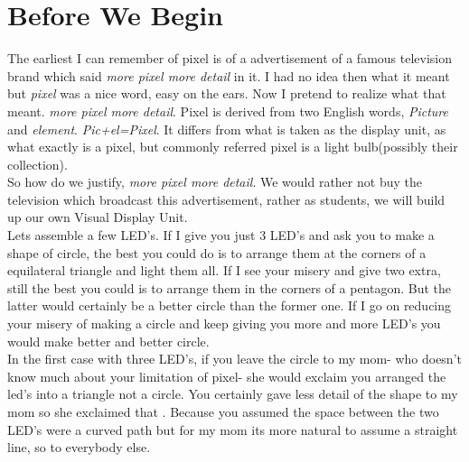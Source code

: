 \documentclass[a4paper,12pt,oneside]{book}
\begin{document}
 
\vfill
\pagebreak


\section*{\textbf Before We Begin}

The earliest I can remember of pixel is of a advertisement of a famous television brand which said \emph{more pixel more detail} in it. I had no idea then what it meant but \emph{pixel} was a nice word, easy on the ears. Now I pretend to realize what that meant. \emph{more pixel more detail}.
Pixel is derived from two English words, \emph{Picture} and \emph{element}. \emph{Pic+el=Pixel}.
It differs from what is taken as the display unit, as what exactly is a pixel, but commonly referred pixel is a light bulb(possibly their collection). \\
So how do we justify, \emph{more pixel more detail}. We would rather not buy the television which broadcast this advertisement, rather as students, we will build up our own Visual Display Unit.\\
Lets assemble a few LED's. If I give you just 3 LED's and ask you to make a shape of circle, the best you could do is to arrange them at the corners of a equilateral triangle and light them all. If I see your misery and give two extra, still the best you could is to arrange them in the corners of a pentagon. But the latter would certainly be a better circle than the former one. If I go on reducing your misery of making a circle and keep giving you more and more LED's you would make better and better circle.\\
In the first case with three LED's, if you leave the circle to my mom- who doesn't know much about your limitation of pixel- she would exclaim you arranged the led's into a triangle not a circle. You certainly gave less detail of the shape to my mom so she exclaimed that . Because you assumed the space between the two LED's were a curved path but for my mom its more natural to assume a straight line, so to everybody else. \\
\end{document}
